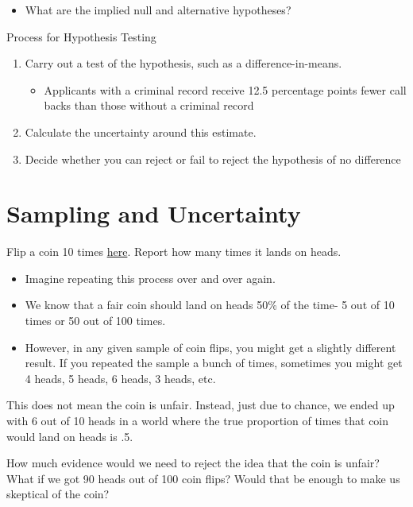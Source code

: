 \documentclass[
  letterpaper,
  DIV=11,
  numbers=noendperiod]{scrreprt}
\providecommand{\tightlist}{%
  \setlength{\itemsep}{0pt}\setlength{\parskip}{0pt}}\usepackage{longtable,booktabs,array}
\begin{document}
\begin{itemize}
\tightlist
\item
  What are the implied null and alternative hypotheses?
\end{itemize}

Process for Hypothesis Testing

\begin{enumerate}
\def\labelenumi{\arabic{enumi}.}
\setcounter{enumi}{3}
\tightlist
\item
  Carry out a test of the hypothesis, such as a difference-in-means.

  \begin{itemize}
  \tightlist
  \item
    Applicants with a criminal record receive 12.5 percentage points
    fewer call backs than those without a criminal record
  \end{itemize}
\item
  Calculate the uncertainty around this estimate.
\item
  Decide whether you can reject or fail to reject the hypothesis of no
  difference
\end{enumerate}

\hypertarget{sampling-and-uncertainty}{%
\section{Sampling and Uncertainty}\label{sampling-and-uncertainty}}

Flip a coin 10 times \href{https://flipsimu.com/}{here}. Report how many
times it lands on heads.

\begin{itemize}
\tightlist
\item
  Imagine repeating this process over and over again.
\item
  We know that a fair coin should land on heads 50\% of the time- 5 out
  of 10 times or 50 out of 100 times.
\item
  However, in any given sample of coin flips, you might get a slightly
  different result. If you repeated the sample a bunch of times,
  sometimes you might get 4 heads, 5 heads, 6 heads, 3 heads, etc.
\end{itemize}

This does not mean the coin is unfair. Instead, just due to chance, we
ended up with 6 out of 10 heads in a world where the true proportion of
times that coin would land on heads is .5.

How much evidence would we need to reject the idea that the coin is
unfair? What if we got 90 heads out of 100 coin flips? Would that be
enough to make us skeptical of the coin?
\end{document}
